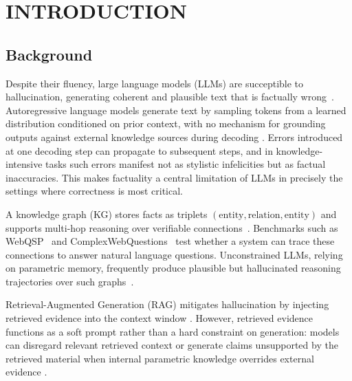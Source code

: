 
\chapter{INTRODUCTION}

\ifpdf
  \graphicspath{{introduction/figures/PNG}{introduction/figures/PDF}{introduction/figures}}
\else
  \graphicspath{{introduction/figures/EPS}{introduction/figures}}
\fi

\section{Background}

Despite their fluency, large language models (LLMs) are succeptible to hallucination, generating coherent and plausible text that is factually wrong~\citep{ji2023survey,huang2023survey}. Autoregressive language models generate text by sampling tokens from a learned distribution conditioned on prior context, with no mechanism for grounding outputs against external knowledge sources during decoding \citep{lewis2020rag}. Errors introduced at one decoding step can propagate to subsequent steps, and in knowledge-intensive tasks such errors manifest not as stylistic infelicities but as factual inaccuracies. This makes factuality a central limitation of LLMs in precisely the settings where correctness is most critical.

A knowledge graph (KG) stores facts as triplets $(\text{entity}, \text{relation}, \text{entity})$ and supports multi-hop reasoning over verifiable connections~\citep{bollacker2008freebase}. Benchmarks such as WebQSP~\citep{yih2016websqp} and ComplexWebQuestions~\citep{talmor2018cwq} test whether a system can trace these connections to answer natural language questions. Unconstrained LLMs, relying on parametric memory, frequently produce plausible but hallucinated reasoning trajectories over such graphs~\citep{he2021improving,lan2022survey}.

Retrieval-Augmented Generation (RAG) mitigates hallucination by injecting retrieved evidence into the context window \citep{lewis2020rag,izacard2021leveraging}. However, retrieved evidence functions as a soft prompt rather than a hard constraint on generation: models can disregard relevant retrieved context or generate claims unsupported by the retrieved material when internal parametric knowledge overrides external evidence \citep{asai2024selfrag}.

